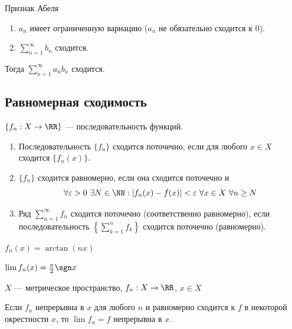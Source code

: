 \begin{assrt}{Признак Абеля}{}
    \begin{enumerate}
        \item
            \( a_n \) имеет ограниченную вариацию (\( a_n \) не обязательно сходится к \( 0 \)).
        \item
            \( \sum\limits_{n = 1}^{\infty} b_n \) сходится.
    \end{enumerate}

    Тогда \( \sum\limits_{n = 1}^{\infty} a_n b_n \) сходится.
\end{assrt}

\subsection{Равномерная сходимость}

\( \{ f_n : X \to \RR \} \) --- последовательность функций.

\begin{defn}{}{}
    \begin{enumerate}
        \item
            Последовательность \( \{ f_n \} \) сходится поточечно,
            если для любого \( x \in X \) сходится \( \{ f_n (x) \} \).
        \item
            \( \{ f_n \} \) сходится равномерно,
            если она сходится поточечно и
            \[
                \forall \varepsilon > 0 \ \exists N \in \NN : | f_n (x) - f(x) | < \varepsilon \ \forall x \in X \ \forall n \geq N
            \]
        \item
            Ряд \( \sum\limits_{n = 1}^{\infty} f_n \) сходится поточечно (соответственно равномерно),
            если последовательность \( \left\{ \sum\limits_{k = 1}^{n} f_k \right\} \) сходится
            поточечно (равномерно).
    \end{enumerate}
\end{defn}

\begin{example}{}{}
    \( f_n (x) = \arctan (nx) \)

    \( \lim f_n (x) = \frac{\pi}{2} \sgn x \)
\end{example}

\begin{assrt}{}{}
    \( X \) --- метрическое пространство, \( f_n : X \to \RR \), \( x \in X \)

    Если \( f_n \) непрерывна в \( x \) для любого \( n \)
    и равномерно сходится к \( f \) в некоторой окрестности \( x \),
    то \( \lim f_n = f \) непрерывна в \( x \).
\end{assrt}

